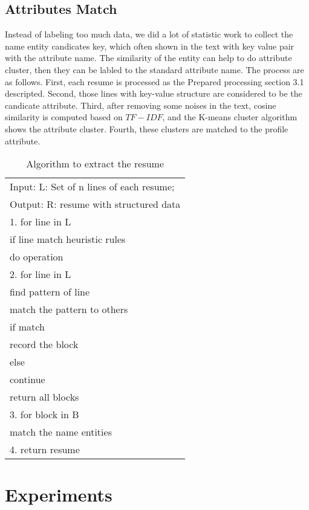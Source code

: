 \documentclass{acm_proc_article-sp}
\begin{document}
\subsection{Attributes Match}

Instead of labeling too much data, we did a lot of statistic work to collect the name entity candicates key, which often shown in the text with key value pair with the attribute name.
The similarity of the entity can help to do attribute cluster, then they can be labled to the standard attribute name.
The process are as follows.
First, each resume is processed as the Prepared processing section 3.1 descripted.
Second, those lines with key-value structure are considered to be the candicate attribute.
Third, after removing some noises in the text, cosine similarity is computed based on $TF-IDF$, and the K-means cluster algorithm shows the attribute cluster.
Fourth, these clusters are matched to the profile attribute.


\begin{table}
\centering
\caption{Algorithm to extract the resume}
\begin{tabular}{|l|} \hline
Input: L: Set of n lines of each resume;\\
Output: R: resume with structured data \\ \hline
1. for line in L\\
	if line match heuristic rules\\
		do operation\\
2. for line in L\\
	find pattern of line\\
	match the pattern to others\\
	if match\\
		record the block\\
	else\\
		continue\\
	return all blocks\\
3. for block in B\\
	match the name entities\\
4. return resume\\
\hline
\end{tabular}
\end{table}

\section{Experiments}
\end{document}
